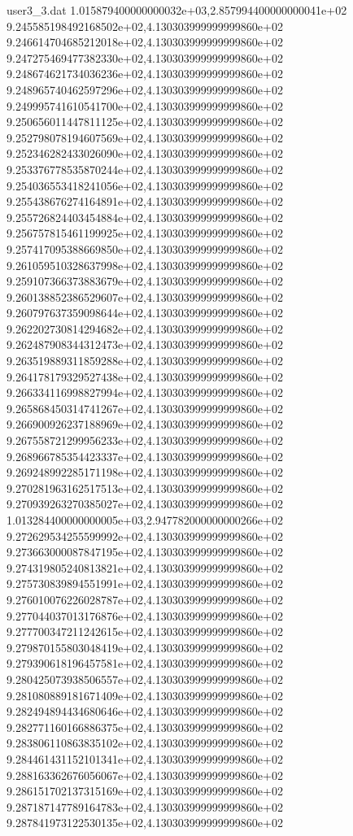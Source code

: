 \begin{filecontents}{user3_3.dat}
1.015879400000000032e+03,2.857994400000000041e+02
9.245585198492168502e+02,4.130303999999999860e+02
9.246614704685212018e+02,4.130303999999999860e+02
9.247275469477382330e+02,4.130303999999999860e+02
9.248674621734036236e+02,4.130303999999999860e+02
9.248965740462597296e+02,4.130303999999999860e+02
9.249995741610541700e+02,4.130303999999999860e+02
9.250656011447811125e+02,4.130303999999999860e+02
9.252798078194607569e+02,4.130303999999999860e+02
9.252346282433026090e+02,4.130303999999999860e+02
9.253376778535870244e+02,4.130303999999999860e+02
9.254036553418241056e+02,4.130303999999999860e+02
9.255438676274164891e+02,4.130303999999999860e+02
9.255726824403454884e+02,4.130303999999999860e+02
9.256757815461199925e+02,4.130303999999999860e+02
9.257417095388669850e+02,4.130303999999999860e+02
9.261059510328637998e+02,4.130303999999999860e+02
9.259107366373883679e+02,4.130303999999999860e+02
9.260138852386529607e+02,4.130303999999999860e+02
9.260797637359098644e+02,4.130303999999999860e+02
9.262202730814294682e+02,4.130303999999999860e+02
9.262487908344312473e+02,4.130303999999999860e+02
9.263519889311859288e+02,4.130303999999999860e+02
9.264178179329527438e+02,4.130303999999999860e+02
9.266334116998827994e+02,4.130303999999999860e+02
9.265868450314741267e+02,4.130303999999999860e+02
9.266900926237188969e+02,4.130303999999999860e+02
9.267558721299956233e+02,4.130303999999999860e+02
9.268966785354423337e+02,4.130303999999999860e+02
9.269248992285171198e+02,4.130303999999999860e+02
9.270281963162517513e+02,4.130303999999999860e+02
9.270939263270385027e+02,4.130303999999999860e+02
1.013284400000000005e+03,2.947782000000000266e+02
9.272629534255599992e+02,4.130303999999999860e+02
9.273663000087847195e+02,4.130303999999999860e+02
9.274319805240813821e+02,4.130303999999999860e+02
9.275730839894551991e+02,4.130303999999999860e+02
9.276010076226028787e+02,4.130303999999999860e+02
9.277044037013176876e+02,4.130303999999999860e+02
9.277700347211242615e+02,4.130303999999999860e+02
9.279870155803048419e+02,4.130303999999999860e+02
9.279390618196457581e+02,4.130303999999999860e+02
9.280425073938506557e+02,4.130303999999999860e+02
9.281080889181671409e+02,4.130303999999999860e+02
9.282494894434680646e+02,4.130303999999999860e+02
9.282771160166886375e+02,4.130303999999999860e+02
9.283806110863835102e+02,4.130303999999999860e+02
9.284461431152101341e+02,4.130303999999999860e+02
9.288163362676056067e+02,4.130303999999999860e+02
9.286151702137315169e+02,4.130303999999999860e+02
9.287187147789164783e+02,4.130303999999999860e+02
9.287841973122530135e+02,4.130303999999999860e+02

\end{filecontents}
